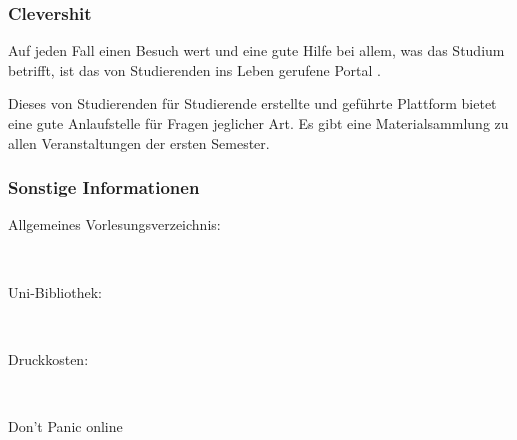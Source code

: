 	\subsubsection*{Clevershit}

		Auf jeden Fall einen Besuch wert und eine gute Hilfe bei allem, was das Studium betrifft, ist das von Studierenden ins Leben gerufene Portal \mbox{}.

		Dieses von Studierenden für Studierende erstellte und geführte Plattform bietet eine gute Anlaufstelle für Fragen jeglicher Art. Es gibt eine Materialsammlung zu allen Veranstaltungen der ersten Semester.

\subsubsection*{Sonstige Informationen}
	\begin{description}
		\item[Allgemeines Vorlesungsverzeichnis:] ~\\
			{\footnotesize{}}
		\item[Uni-Bibliothek:] ~\\
			{\footnotesize{}}
		\item[Druckkosten:] ~\\
			{\footnotesize{}}
		\item[Don't Panic online] ~\\
			{\footnotesize{}}
	\end{description}
